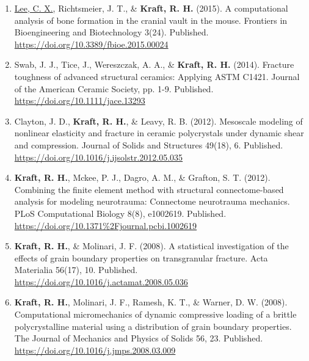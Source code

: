\documentclass[a4paper,10pt]{article}
\begin{document}
\begin{enumerate}
\item \underline{Lee, C. X.}, Richtsmeier, J. T., \& \textbf{\textbf{Kraft,} R. H.} (2015). A computational analysis of bone formation in the cranial vault in the mouse. Frontiers in Bioengineering and Biotechnology 3(24). Published. \url{https://doi.org/10.3389/fbioe.2015.00024}
\item Swab, J. J., Tice, J., Wereszczak, A. A., \& \textbf{\textbf{Kraft,} R. H.} (2014). Fracture toughness of advanced structural ceramics: Applying ASTM C1421. Journal of the American Ceramic Society, pp. 1-9. Published. \url{https://doi.org/10.1111/jace.13293}
\item Clayton, J. D., \textbf{\textbf{Kraft,} R. H.}, \& Leavy, R. B. (2012). Mesoscale modeling of nonlinear elasticity and fracture in ceramic polycrystals under dynamic shear and compression. Journal of Solids and Structures 49(18), 6. Published. \url{https://doi.org/10.1016/j.ijsolstr.2012.05.035}
\item \textbf{\textbf{Kraft,} R. H.}, Mckee, P. J., Dagro, A. M., \& Grafton, S. T. (2012). Combining the finite element method with structural connectome-based analysis for modeling neurotrauma: Connectome neurotrauma mechanics. PLoS Computational Biology 8(8), e1002619. Published. \url{https://doi.org/10.1371%2Fjournal.pcbi.1002619}
\item \textbf{\textbf{Kraft,} R. H.}, \& Molinari, J. F. (2008). A statistical investigation of the effects of grain boundary properties on transgranular fracture. Acta Materialia 56(17), 10. Published. \url{https://doi.org/10.1016/j.actamat.2008.05.036}
\item \textbf{\textbf{Kraft,} R. H.}, Molinari, J. F., Ramesh, K. T., \& Warner, D. W. (2008). Computational micromechanics of dynamic compressive loading of a brittle polycrystalline material using a distribution of grain boundary properties. The Journal of Mechanics and Physics of Solids 56, 23. Published. \url{https://doi.org/10.1016/j.jmps.2008.03.009}
\end{enumerate}
\end{document}
